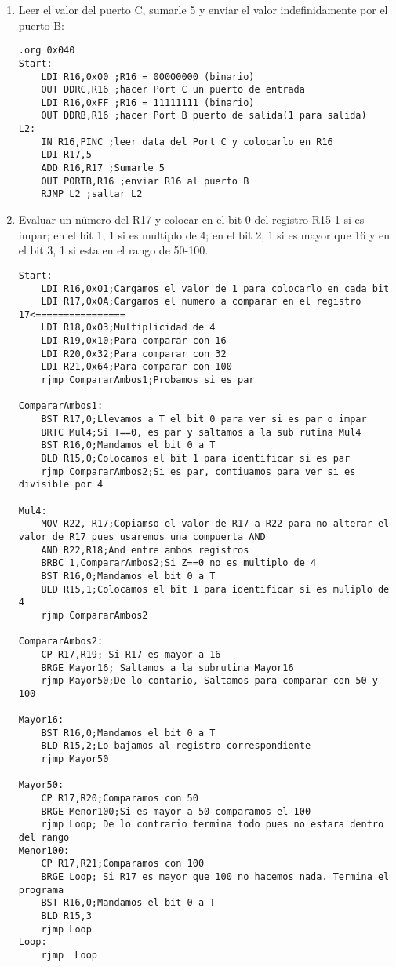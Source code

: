 \documentclass[
	12pt, %
	fleqn, %
	a4paper, %
	oneside, %
]{LegrandOrangeBook}
\begin{document}
\begin{enumerate}
\item Leer el valor del puerto C, sumarle 5 y enviar el valor indefinidamente por el puerto B:
\begin{lstlisting}[language={[RISC-V]Assembler},frame=single,caption={Leer el valor del puerto C y sumar},captionpos=b,numbers=none]
.org 0x040
Start:
	LDI R16,0x00 ;R16 = 00000000 (binario)
	OUT DDRC,R16 ;hacer Port C un puerto de entrada
	LDI R16,0xFF ;R16 = 11111111 (binario)
	OUT DDRB,R16 ;hacer Port B puerto de salida(1 para salida)
L2: 
	IN R16,PINC ;leer data del Port C y colocarlo en R16
	LDI R17,5
	ADD R16,R17 ;Sumarle 5
	OUT PORTB,R16 ;enviar R16 al puerto B
	RJMP L2 ;saltar L2
\end{lstlisting}
\item Evaluar un número del R17 y colocar en el bit 0 del registro R15 1 si es impar; en el bit 1, 1 si es multiplo de 4; en el bit 2, 1 si es mayor que 16 y en el bit 3, 1 si esta en el rango de 50-100.
\begin{lstlisting}[language={[RISC-V]Assembler},frame=single,caption={SET los bits desde el 0 al 3 si cumple ciertas condiciones},captionpos=b,numbers=none]
Start:
	LDI R16,0x01;Cargamos el valor de 1 para colocarlo en cada bit
	LDI R17,0x0A;Cargamos el numero a comparar en el registro 17<================
	LDI R18,0x03;Multiplicidad de 4
	LDI R19,0x10;Para comparar con 16
	LDI R20,0x32;Para comparar con 32
	LDI R21,0x64;Para comparar con 100
	rjmp CompararAmbos1;Probamos si es par

CompararAmbos1:
	BST R17,0;Llevamos a T el bit 0 para ver si es par o impar
	BRTC Mul4;Si T==0, es par y saltamos a la sub rutina Mul4
	BST R16,0;Mandamos el bit 0 a T
	BLD R15,0;Colocamos el bit 1 para identificar si es par
	rjmp CompararAmbos2;Si es par, contiuamos para ver si es divisible por 4

Mul4:
	MOV R22, R17;Copiamso el valor de R17 a R22 para no alterar el valor de R17 pues usaremos una compuerta AND
	AND R22,R18;And entre ambos registros
	BRBC 1,CompararAmbos2;Si Z==0 no es multiplo de 4
	BST R16,0;Mandamos el bit 0 a T
	BLD R15,1;Colocamos el bit 1 para identificar si es muliplo de 4
	rjmp CompararAmbos2

CompararAmbos2:
	CP R17,R19; Si R17 es mayor a 16
	BRGE Mayor16; Saltamos a la subrutina Mayor16
	rjmp Mayor50;De lo contario, Saltamos para comparar con 50 y 100
	
Mayor16:
	BST R16,0;Mandamos el bit 0 a T
	BLD R15,2;Lo bajamos al registro correspondiente
	rjmp Mayor50

Mayor50:
	CP R17,R20;Comparamos con 50
	BRGE Menor100;Si es mayor a 50 comparamos el 100
	rjmp Loop; De lo contrario termina todo pues no estara dentro del rango
Menor100:
	CP R17,R21;Comparamos con 100
	BRGE Loop; Si R17 es mayor que 100 no hacemos nada. Termina el programa
	BST R16,0;Mandamos el bit 0 a T
	BLD R15,3
	rjmp Loop
Loop:    
    rjmp  Loop
\end{lstlisting}
\end{enumerate}
\end{document}

